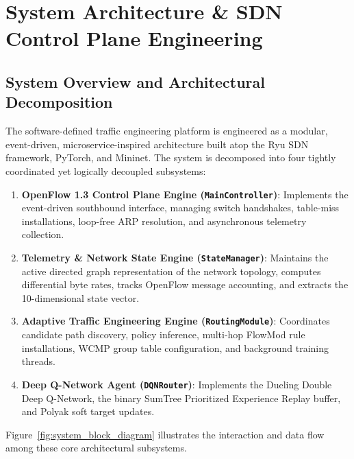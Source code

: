 \chapter{System Architecture \& SDN Control Plane Engineering}
\label{chap:architecture}

\section{System Overview and Architectural Decomposition}
The software-defined traffic engineering platform is engineered as a modular, event-driven, microservice-inspired architecture built atop the Ryu SDN framework, PyTorch, and Mininet. The system is decomposed into four tightly coordinated yet logically decoupled subsystems:
\begin{enumerate}
    \item \textbf{OpenFlow 1.3 Control Plane Engine (\texttt{MainController})}: Implements the event-driven southbound interface, managing switch handshakes, table-miss installations, loop-free ARP resolution, and asynchronous telemetry collection.
    \item \textbf{Telemetry \& Network State Engine (\texttt{StateManager})}: Maintains the active directed graph representation of the network topology, computes differential byte rates, tracks OpenFlow message accounting, and extracts the 10-dimensional state vector.
    \item \textbf{Adaptive Traffic Engineering Engine (\texttt{RoutingModule})}: Coordinates candidate path discovery, policy inference, multi-hop FlowMod rule installations, WCMP group table configuration, and background training threads.
    \item \textbf{Deep Q-Network Agent (\texttt{DQNRouter})}: Implements the Dueling Double Deep Q-Network, the binary SumTree Prioritized Experience Replay buffer, and Polyak soft target updates.
\end{enumerate}

Figure~\ref{fig:system_block_diagram} illustrates the interaction and data flow among these core architectural subsystems.

